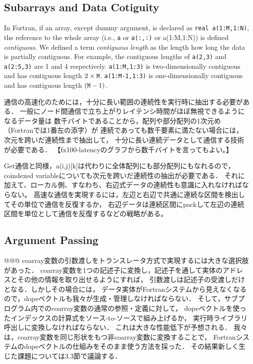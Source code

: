 \subsection{Subarrays and Data Cotiguity}

In Fortran, if an array, except dummy argument, is declared as {\tt real a(1:M,1:N)}, 
the reference to the whole array (i.e., {\tt a} or {\tt a(:,:)} or {a(1:M,1:N)})
is defined {\em contiguous}. 
We defined a term {\em contiguous length} as the length how long the data is partially
contiguous. For example, the contiguous lengths of {\tt a(2,3)} and {\tt a(2:5,3)} are
1 and 4 respectively.  {\tt a(1:M,1:3)} is two-dimensionally contiguous and has 
contiguous length $2 \times {\tt M}$.
{\tt a(1:M-1,1:3)} is one-dimensionally contiguous and has 
contiguous length $({\tt M} - 1)$.

\requirement
通信の高速化のためには，十分に長い範囲の連続性を実行時に抽出する必要がある．
一般にノード間通信で立ち上がりレイテンシ時間がほぼ無視できるようになるデータ量は
数千バイトであることから，配列や部分配列の1次元め（Fortranでは1番左の添字）が
連続であっても数千要素に満たない場合には，次元を跨いだ連続性まで抽出して，
十分に長い連続データとして通信する技術が必要である．
【fx100-latencyのグラフから数千バイトを言ってもよい。】

Get通信と同様，a(i,j)[k]は代わりに全体配列にも部分配列にもなれるので，
coindexed variableについても次元を跨いだ連続性の抽出が必要である．
それに加えて、ローカル側、すなわち、右辺式データの連続性も意識に入れなければならない。
高速な通信を実現するには，左辺と右辺で共通に連続な区間を検出してその単位で通信を反復するか，
右辺データは連続区間にpackして左辺の連続区間を単位として通信を反復するなどの戦略がある。



\subsection{Argument Passing}
@@@
coarray変数の引数渡しをトランスレータ方式で実現するには大きな選択肢があった．
coarray変数を1つの記述子に変換し，記述子を通して実体のアドレスとその他の情報を取り出せるようにすれば，
引数渡しは記述子の受渡しだけとなる．しかしその場合には，
データ実体がFortranシステムから見えなくなるので，dopeベクトルも我々が生成・管理しなければならない．
そして，サブプログラム内でのcoarray変数の通常の参照・定義に対して，
dopeベクトルを使ったインデックスの計算式をソース-to-ソースで組み上げるか，
実行時ライブラリ呼出しに変換しなければならない．
これは大きな性能低下が予想される．
我々は，coarray変数を同じ形状をもつ非coarray変数に変換することで，
Fortranシステムのdopeベクトルの仕組みをそのまま使う方法を採った．
その結果新しく生じた課題については3.3節で議論する．


